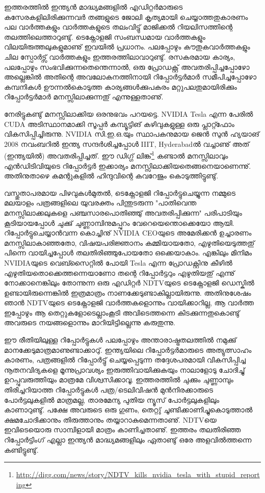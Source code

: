 ഇത്തരത്തില്‍ ഇന്ത്യന്‍ മാദ്ധ്യമങ്ങളില്‍ എഡിറ്റര്‍മാരുടെ കസേരകളിലിരിക്കുന്നവര്‍ തങ്ങളുടെ ജോലി കൃത്യമായി 
ചെയ്യാത്തതുകാരണം പല വാര്‍ത്തകളും വാര്‍ത്തകളുടെ തലംവിട്ടു് മാജിക്കല്‍ റിയലിസത്തിന്റെ തലത്തിലെത്താറുണ്ടു്. 
ടെക്നോളജി സംബന്ധമായ വാര്‍ത്തകളും വിലയിരുത്തലുകളുമാണു് ഇവയില്‍ പ്രധാനം. പലപ്പോഴും കൗതുകവാര്‍ത്തകളും 
ചില സ്പോര്‍ട്സ് വാര്‍ത്തകളും ഇത്തരത്തിലാവാറുണ്ടു്. രസകരമായ കാര്യം, പലപ്പോഴും 
സംഭവിക്കുന്നതെന്തെന്നാല്‍, ഒരു പ്രോഡക്റ്റ് അവതരിപ്പിച്ചപ്പോഴോ അല്ലെങ്കില്‍ അതിന്റെ അവലോകനത്തിനായി 
റിപ്പോര്‍ട്ടര്‍മാര്‍ സമീപിച്ചപ്പോഴോ കമ്പനികള്‍ ഊന്നല്‍കൊടുത്ത കാര്യങ്ങള്‍ക്കുപകരം മറ്റുപലതുമായിരിക്കും 
റിപ്പോര്‍ട്ടര്‍മാര്‍ മനസ്സിലാക്കുന്നതു് എന്നുള്ളതാണു്.

നേരിട്ടുകണ്ടു് മനസ്സിലാക്കിയ ഒരനുഭവം പറയട്ടെ. NVIDIA Tesla എന്ന പേരില്‍ CUDA അടിസ്ഥാനമാക്കി 
സൂപ്പര്‍ കമ്പ്യൂട്ടിങ് കഴിവുകളുള്ള ഒരു പ്ലാറ്റ്ഫോം വികസിപ്പിച്ചിരുന്നു. NVIDIA സി.ഇ.ഒ.യും സ്ഥാപകനുമായ ജെന്‍ സുന്‍ 
ഹ്യയാങ് 2008 നവംബറില്‍ ഇന്ത്യ സന്ദര്‍ശിച്ചപ്പോള്‍ IIIT, Hyderabadല്‍ വച്ചാണു് അത് (ഇന്ത്യയില്‍) 
അവതരിപ്പിച്ചത്. ഈ ഡിഗ്ഗ് 
ലിങ്ക്\footnote{\url{http://digg.com/news/story/NDTV_kills_nvidia_tesla_with_stupid_reporting}}
കണ്ടാല്‍ മനസ്സിലാവും എന്‍ഡിടിവിയുടെ റിപ്പോര്‍ട്ടര്‍ ഇക്കാര്യം 
മനസ്സിലാക്കിയതെങ്ങനെയാണെന്നു്. അതിനുതാഴെ കമന്റുകളില്‍ ഹിന്ദുവിന്റെ കവറേജും കൊടുത്തിട്ടുണ്ടു്.

വസ്തുതാപരമായ പിഴവുകള്‍മുതല്‍, ടെക്നോളജി റിപ്പോര്‍ട്ടുചെയ്യുന്ന നമ്മുടെ മലയാളം പത്രങ്ങളിലെ യുവരക്തം 
പിന്തുടരുന്ന "പാതിവെന്ത മനസ്സിലാക്കലുകളെ പഞ്ചസാരപൊതിഞ്ഞു് അവതരിപ്പിക്കുന്ന" പരിപാടിയും കൂടിയായപ്പോള്‍ 
ചുക്കു് ചുണ്ണാമ്പിനുമപ്പുറം വേറെയെന്തൊക്കെയോ ആയി. റിപ്പോര്‍ട്ടുചെയ്യാന്‍വന്ന കൊച്ചിനു് NVIDIA CEOയുടെ 
അമേരിക്കന്‍ ഉച്ചാരണം മനസ്സിലാകാഞ്ഞതോ, വിഷയപരിജ്ഞാനം കമ്മിയായതോ, എഴുതിയെടുത്തതു് പിന്നെ 
വായിച്ചപ്പോള്‍ തലതിരിഞ്ഞുപോയതോ ഒക്കെയാകാം. എങ്കിലും മിനിമം NVIDIAയുടെ വെബ്സൈറ്റില്‍ പോയി Tesla 
എന്ന പ്രോഡക്റ്റിനു കീഴില്‍ എഴുതിയതൊക്കെത്തന്നെയാണോ തന്റെ റിപ്പോര്‍ട്ടറും എഴുതിയതു് എന്നു് നോക്കാനെങ്കിലും 
തോന്നുന്ന ഒരു എഡിറ്റര്‍ NDTVയുടെ ടെക്നോളജി ഡെസ്കില്‍ ഉണ്ടായിരുന്നെങ്കില്‍ ഇത്രമാത്രം 
നാണക്കേടുണ്ടാകില്ലായിരുന്നു. അതിനുശേഷം ഞാന്‍ NDTVയുടെ ടെക്നോളജി വാര്‍ത്തകളൊന്നും വായിക്കാറില്ല, 
ആ വാര്‍ത്ത ഇപ്പോഴും ആ തെറ്റുകളോടെല്ലാംകൂടി അവിടെത്തന്നെ കിടക്കുന്നതുകൊണ്ടു് അവരുടെ നയങ്ങളൊന്നും 
മാറിയിട്ടില്ലെന്നു കരുതുന്നു.

ഈ രീതിയിലുള്ള റിപ്പോര്‍ട്ടുകള്‍ പലപ്പോഴും അന്താരാഷ്ട്രതലത്തില്‍ നമുക്കു് മാനക്കേടുമാത്രമാണുണ്ടാക്കാറു്. ഇന്ത്യയിലെ 
റിപ്പോര്‍ട്ടര്‍മാരുടെ അത്യുത്സാഹം കാരണം, പത്രങ്ങളില്‍ റിപ്പോര്‍ട്ടു് ചെയ്യപ്പെടുന്ന തദ്ദേശപരമായി വികസിപ്പിച്ച നൂതനവിദ്യകളെ 
മൂന്നുപ്രാവശ്യം ഇരുത്തിവായിക്കുകയും നാലാളോടു ചോദിച്ചു് ഉറപ്പുവരുത്തിയും മാത്രമേ വിശ്വസിക്കാവൂ.
 ഇത്തരത്തില്‍ ചുക്കും ചുണ്ണാമ്പും തിരിച്ചറിയാത്ത റിപ്പോര്‍ട്ടുകള്‍ പത്ര/ടെലിവിഷന്‍ മുന്‍നിരക്കാരുടെ 
പോര്‍ട്ടലുകളില്‍ മാത്രമല്ല, താരമേന്യ പുതിയ ന്യൂസ് പോര്‍ട്ടലുകളിലും കാണാറുണ്ടു്. പക്ഷേ അവരുടെ ഒരു ഗുണം, തെറ്റു് 
ചൂണ്ടിക്കാണിച്ചുകൊടുത്താല്‍ ക്ഷമചോദിക്കാനും തിരുത്താനും തയ്യാറാകുമെന്നതാണു്. NDTVയെ ഇവിടെയൊരു 
സാമ്പിളായി മാത്രം കാണിച്ചതാണു്. ഇത്തരം തലതിരിഞ്ഞ റിപ്പോര്‍ട്ടിംഗ് എല്ലാ ഇന്ത്യന്‍ മാദ്ധ്യമങ്ങളിലും ഏതാണ്ടു് ഒരേ 
അളവില്‍ത്തന്നെ കണ്ടിട്ടുണ്ടു്.

